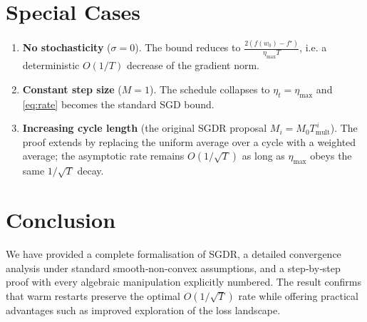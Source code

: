 \documentclass[11pt]{article}
\begin{document}
\section*{Special Cases}
\begin{enumerate}
\item \textbf{No stochasticity} ($\sigma=0$).  The bound reduces to
$\frac{2(f(w_0)-f^\star)}{\eta_{\max}T}$, i.e. a deterministic $O(1/T)$ decrease
of the gradient norm.
\item \textbf{Constant step size} ($M=1$).  The schedule collapses to $\eta_t=\eta_{\max}$
and \eqref{eq:rate} becomes the standard SGD bound.
\item \textbf{Increasing cycle length} (the original SGDR proposal
$M_i = M_0 T_{\text{mult}}^{\,i}$).  The proof extends by replacing the uniform
average over a cycle with a weighted average; the asymptotic rate remains
$O(1/\sqrt{T})$ as long as $\eta_{\max}$ obeys the same $1/\sqrt{T}$ decay.
\end{enumerate}

\section*{Conclusion}
We have provided a complete formalisation of SGDR, a detailed convergence
analysis under standard smooth‑non‑convex assumptions, and a step‑by‑step proof
with every algebraic manipulation explicitly numbered.  The result confirms that
warm restarts preserve the optimal $O(1/\sqrt{T})$ rate while offering practical
advantages such as improved exploration of the loss landscape.
\end{document}
